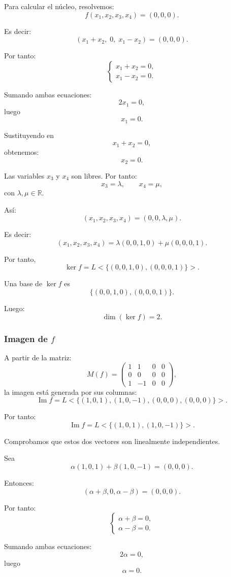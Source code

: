 \documentclass[12pt]{article}
\begin{document}
Para calcular el núcleo, resolvemos:
\[
f(x_1,x_2,x_3,x_4)=(0,0,0).
\]

Es decir:
\[
(x_1+x_2,\;0,\;x_1-x_2)=(0,0,0).
\]

Por tanto:
\[
\begin{cases}
x_1+x_2=0,\\
x_1-x_2=0.
\end{cases}
\]

Sumando ambas ecuaciones:
\[
2x_1=0,
\]
luego
\[
x_1=0.
\]

Sustituyendo en
\[
x_1+x_2=0,
\]
obtenemos:
\[
x_2=0.
\]

Las variables \(x_3\) y \(x_4\) son libres. Por tanto:
\[
x_3=\lambda,
\qquad
x_4=\mu,
\]
con \(\lambda,\mu\in\mathbb{R}\).

Así:
\[
(x_1,x_2,x_3,x_4)=(0,0,\lambda,\mu).
\]

Es decir:
\[
(x_1,x_2,x_3,x_4)
=
\lambda(0,0,1,0)+\mu(0,0,0,1).
\]

Por tanto,
\[
\ker f=L<\{(0,0,1,0),(0,0,0,1)\}>.
\]

Una base de \(\ker f\) es
\[
\boxed{\{(0,0,1,0),(0,0,0,1)\}.}
\]

Luego:
\[
\boxed{\dim(\ker f)=2.}
\]

\subsubsection*{Imagen de \(f\)}

A partir de la matriz:
\[
M(f)=
\begin{pmatrix}
1&1&0&0\\
0&0&0&0\\
1&-1&0&0
\end{pmatrix},
\]
la imagen está generada por sus columnas:
\[
\operatorname{Im} f
=
L<\{(1,0,1),(1,0,-1),(0,0,0),(0,0,0)\}>.
\]

Por tanto:
\[
\operatorname{Im} f
=
L<\{(1,0,1),(1,0,-1)\}>.
\]

Comprobamos que estos dos vectores son linealmente independientes.

Sea
\[
\alpha(1,0,1)+\beta(1,0,-1)=(0,0,0).
\]

Entonces:
\[
(\alpha+\beta,0,\alpha-\beta)=(0,0,0).
\]

Por tanto:
\[
\begin{cases}
\alpha+\beta=0,\\
\alpha-\beta=0.
\end{cases}
\]

Sumando ambas ecuaciones:
\[
2\alpha=0,
\]
luego
\[
\alpha=0.
\]
\end{document}
